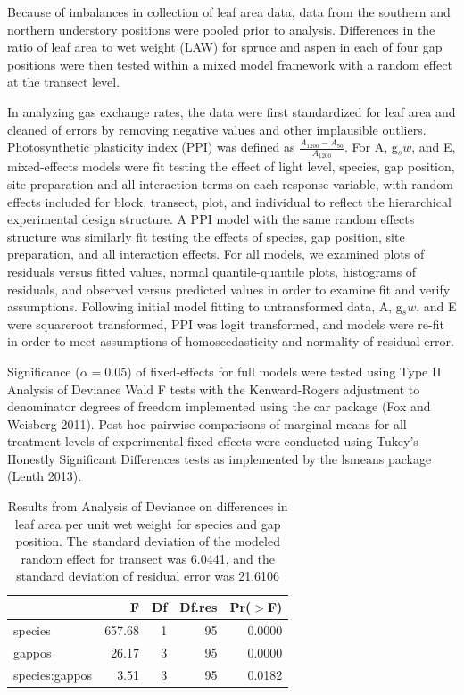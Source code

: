 \documentclass{article}\usepackage[]{graphicx}\usepackage[]{color}
\begin{document}
\begin{multicols}{2}
Because of imbalances in collection of leaf area data, data from the southern and northern understory positions were pooled prior to analysis. Differences in the ratio of leaf area to wet weight (LAW) for spruce and aspen in each of four gap positions were then tested within a mixed model framework with a random effect at the transect level.

In analyzing gas exchange rates, the data were first standardized for leaf area and cleaned of errors by removing negative values and other implausible outliers. Photosynthetic plasticity index (PPI) was defined as $\frac{A_1200-A_50}{A_1200}$. For A, g$_sw$, and E, mixed-effects models were fit testing the effect of light level, species, gap position, site preparation and all interaction terms on each response variable, with random effects included for block, transect, plot, and individual to reflect the hierarchical experimental design structure. A PPI model with the same random effects structure was similarly fit testing the effects of species, gap position, site preparation, and all interaction effects. For all models, we examined plots of residuals versus fitted values, normal quantile-quantile plots, histograms of residuals, and observed versus predicted values in order to examine fit and verify assumptions. Following initial model fitting to untransformed data, A, g$_sw$, and E were squareroot transformed, PPI was logit transformed, and models were re-fit in order to meet assumptions of homoscedasticity and normality of residual error.

Significance ($\alpha=0.05$) of fixed-effects for full models were tested using Type II Analysis of Deviance Wald F tests with the Kenward-Rogers adjustment to denominator degrees of freedom implemented using the car package (Fox and Weisberg 2011). Post-hoc pairwise comparisons of marginal means for all treatment levels of experimental fixed-effects were conducted using Tukey's Honestly Significant Differences tests as implemented by the lsmeans package (Lenth 2013).







\end{multicols}
\begin{table}[ht]
\centering
\begin{tabular}{lrrrr}
  \hline
 & F & Df & Df.res & Pr($>$F) \\ 
  \hline
species & 657.68 & 1 & 95 & 0.0000 \\ 
  gappos & 26.17 & 3 & 95 & 0.0000 \\ 
  species:gappos & 3.51 & 3 & 95 & 0.0182 \\ 
   \hline
\end{tabular}
\caption{Results from Analysis of Deviance on differences in leaf area per unit wet weight for species and gap position. The standard deviation of the modeled random effect for transect was 6.0441, and the standard deviation of residual error was 21.6106} 
\end{table}
\end{document}
